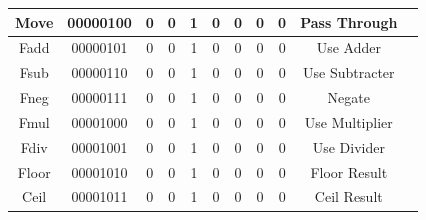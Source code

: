\documentclass[letter,14pt]{article}
\begin{document}
\begin{table}[H]
\begin{tabular}{lllllllllll}
\multicolumn{1}{|c|}{Move} & \multicolumn{1}{c|}{00000100} & \multicolumn{1}{c|}{0} & \multicolumn{1}{c|}{0} & \multicolumn{1}{c|}{1} & \multicolumn{1}{c|}{0} & \multicolumn{1}{c|}{0} & \multicolumn{1}{c|}{0} & \multicolumn{1}{c|}{0} & \multicolumn{1}{c|}{Pass Through} \TBstrut \\[1em] \hline 
\multicolumn{1}{|c|}{Fadd} & \multicolumn{1}{c|}{00000101} & \multicolumn{1}{c|}{0} & \multicolumn{1}{c|}{0} & \multicolumn{1}{c|}{1} & \multicolumn{1}{c|}{0} & \multicolumn{1}{c|}{0} & \multicolumn{1}{c|}{0} & \multicolumn{1}{c|}{0}  & \multicolumn{1}{c|}{Use Adder} \TBstrut \\[1em] \hline
\multicolumn{1}{|c|}{Fsub} & \multicolumn{1}{c|}{00000110} & \multicolumn{1}{c|}{0} & \multicolumn{1}{c|}{0} & \multicolumn{1}{c|}{1} & \multicolumn{1}{c|}{0} & \multicolumn{1}{c|}{0} & \multicolumn{1}{c|}{0} & \multicolumn{1}{c|}{0}  & \multicolumn{1}{c|}{Use Subtracter} \TBstrut \\[1em] \hline
\multicolumn{1}{|c|}{Fneg} & \multicolumn{1}{c|}{00000111} & \multicolumn{1}{c|}{0} & \multicolumn{1}{c|}{0} & \multicolumn{1}{c|}{1} & \multicolumn{1}{c|}{0} & \multicolumn{1}{c|}{0} & \multicolumn{1}{c|}{0} & \multicolumn{1}{c|}{0} & \multicolumn{1}{c|}{Negate} \TBstrut \\[1em] \hline
\multicolumn{1}{|c|}{Fmul} & \multicolumn{1}{c|}{00001000} & \multicolumn{1}{c|}{0} & \multicolumn{1}{c|}{0} & \multicolumn{1}{c|}{1} & \multicolumn{1}{c|}{0} & \multicolumn{1}{c|}{0} & \multicolumn{1}{c|}{0} & \multicolumn{1}{c|}{0} & \multicolumn{1}{c|}{Use Multiplier} \TBstrut \\[1em] \hline
\multicolumn{1}{|c|}{Fdiv} & \multicolumn{1}{c|}{00001001} & \multicolumn{1}{c|}{0} & \multicolumn{1}{c|}{0} & \multicolumn{1}{c|}{1} & \multicolumn{1}{c|}{0} & \multicolumn{1}{c|}{0} & \multicolumn{1}{c|}{0} & \multicolumn{1}{c|}{0} & \multicolumn{1}{c|}{Use Divider} \TBstrut \\[1em] \hline
\multicolumn{1}{|c|}{Floor} & \multicolumn{1}{c|}{00001010} & \multicolumn{1}{c|}{0} & \multicolumn{1}{c|}{0} & \multicolumn{1}{c|}{1} & \multicolumn{1}{c|}{0} & \multicolumn{1}{c|}{0} & \multicolumn{1}{c|}{0} & \multicolumn{1}{c|}{0} & \multicolumn{1}{c|}{Floor Result} \TBstrut \\[1em] \hline
\multicolumn{1}{|c|}{Ceil} & \multicolumn{1}{c|}{00001011} & \multicolumn{1}{c|}{0} & \multicolumn{1}{c|}{0} & \multicolumn{1}{c|}{1} & \multicolumn{1}{c|}{0} & \multicolumn{1}{c|}{0} & \multicolumn{1}{c|}{0} & \multicolumn{1}{c|}{0} & \multicolumn{1}{c|}{Ceil Result} \TBstrut \\[1em] \hline

\end{tabular}
\end{table}
\end{document}
